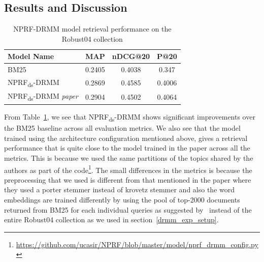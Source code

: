 \subsection{Results and Discussion}
\begin{table}[]
    \centering
    \begin{tabular}{lccc}
    \toprule
        Model Name & MAP & nDCG@20 & P@20 \\
        \midrule
        BM25 & 0.2405 & 0.4038 & 0.347 \\
        NPRF\textsubscript{ds}-DRMM & 0.2869 & 0.4585 & 0.4006 \\
        NPRF\textsubscript{ds}-DRMM \textit{paper} & 0.2904 & 0.4502 & 0.4064 \\
    \bottomrule
    \end{tabular}
    \caption{NPRF-DRMM model retrieval performance on the Robust04 collection}
    \label{tab:nprf_drmm_eval}
\end{table}
From Table~\ref{tab:nprf_drmm_eval}, we see that NPRF\textsubscript{ds}-DRMM shows significant improvements over the BM25 baseline across all evaluation metrics. We also see that the model trained using the architecture configuration mentioned above, gives a retrieval performance that is quite close to the model trained in the paper across all the metrics. This is because we used the same partitions of the topics shared by the authors as part of the code\footnote{\url{https://github.com/ucasir/NPRF/blob/master/model/nprf_drmm_config.py}}. The small differences in the metrics is because the preprocessing that we used is different from that mentioned in the paper where they used a porter stemmer instead of krovetz stemmer and also the word embeddings are trained differently by using the pool of top-2000 documents returned from BM25 for each individual queries as suggested by~\cite{diaz16} instead of the entire Robust04 collection as we used in section~\ref{drmm_exp_setup}.

